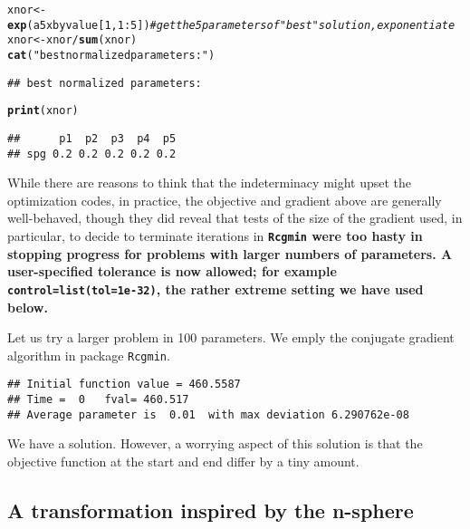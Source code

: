 \documentclass[11pt]{article}\usepackage[]{graphicx}\usepackage[]{color}
\makeatletter
\newcommand{\hlnum}[1]{\textcolor[rgb]{0.686,0.059,0.569}{#1}}%
\newcommand{\hlstr}[1]{\textcolor[rgb]{0.192,0.494,0.8}{#1}}%
\newcommand{\hlcom}[1]{\textcolor[rgb]{0.678,0.584,0.686}{\textit{#1}}}%
\newcommand{\hlopt}[1]{\textcolor[rgb]{0,0,0}{#1}}%
\newcommand{\hlstd}[1]{\textcolor[rgb]{0.345,0.345,0.345}{#1}}%
\newcommand{\hlkwb}[1]{\textcolor[rgb]{0.69,0.353,0.396}{#1}}%
\newcommand{\hlkwd}[1]{\textcolor[rgb]{0.737,0.353,0.396}{\textbf{#1}}}%
\newenvironment{kframe}{%
 \def\at@end@of@kframe{}%
 \ifinner\ifhmode%
  \def\at@end@of@kframe{\end{minipage}}%
  \begin{minipage}{\columnwidth}%
 \fi\fi%
 \def\FrameCommand##1{\hskip\@totalleftmargin \hskip-\fboxsep
 \colorbox{shadecolor}{##1}\hskip-\fboxsep
     \hskip-\linewidth \hskip-\@totalleftmargin \hskip\columnwidth}%
 \MakeFramed {\advance\hsize-\width
   \@totalleftmargin\z@ \linewidth\hsize
   \@setminipage}}%
 {\par\unskip\endMakeFramed%
 \at@end@of@kframe}
\newenvironment{knitrout}{}{} %
\newcommand{\code}[1]{{\tt#1}}
\newcommand{\pkg}[1]{\bf{\tt#1}\rm }
\makeatother
\begin{document}
\begin{knitrout}
\begin{kframe}
\begin{alltt}
\hlstd{xnor}\hlkwb{<-}\hlkwd{exp}\hlstd{(a5xbyvalue[}\hlnum{1}\hlstd{,} \hlnum{1}\hlopt{:}\hlnum{5}\hlstd{])} \hlcom{# get the 5 parameters of "best" solution, exponentiate}
\hlstd{xnor}\hlkwb{<-}\hlstd{xnor}\hlopt{/}\hlkwd{sum}\hlstd{(xnor)}
\hlkwd{cat}\hlstd{(}\hlstr{"best normalized parameters:"}\hlstd{)}
\end{alltt}
\begin{verbatim}
## best normalized parameters:
\end{verbatim}
\begin{alltt}
\hlkwd{print}\hlstd{(xnor)}
\end{alltt}
\begin{verbatim}
##      p1  p2  p3  p4  p5
## spg 0.2 0.2 0.2 0.2 0.2
\end{verbatim}
\end{kframe}
\end{knitrout}


While there are reasons to think that the indeterminacy
might upset the optimization codes, in practice, the objective 
and gradient above are generally
well-behaved, though they did reveal that tests of the size 
of the gradient used, in particular, to
decide to terminate iterations in \pkg{Rcgmin} were too 
hasty in stopping progress for problems
with larger numbers of parameters. A user-specified tolerance is now allowed; for
example \code{control=list(tol=1e-32)}, the rather extreme setting we have used
below. 

Let us try a larger problem in 100 parameters. We emply the conjugate gradient
algorithm in package \code{Rcgmin}.

\begin{knitrout}\scriptsize
{}\color{fgcolor}\begin{kframe}
\begin{verbatim}
## Initial function value = 460.5587
## Time =  0   fval= 460.517
## Average parameter is  0.01  with max deviation 6.290762e-08
\end{verbatim}
\end{kframe}
\end{knitrout}

We have a solution. However, a worrying aspect of this 
solution is that the objective function 
at the start and end differ by a tiny amount. 

\subsection{A transformation inspired by the n-sphere}
\end{document}
